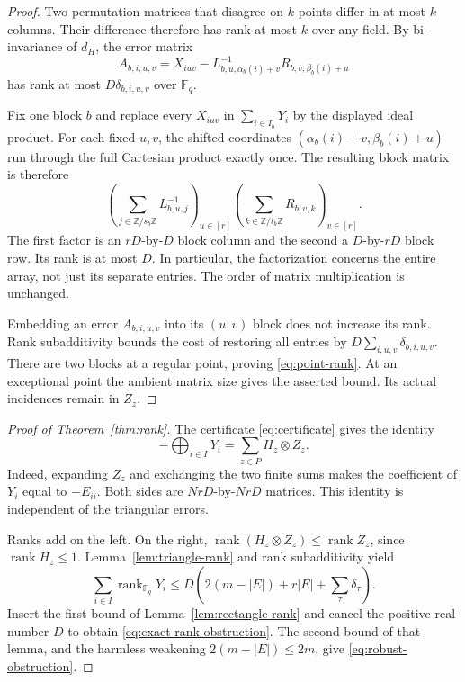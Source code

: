 \documentclass[11pt]{amsart}
\theoremstyle{definition}
\theoremstyle{remark}
\numberwithin{equation}{section}
\newcommand{\F}{\mathbb F}
\newcommand{\Z}{\mathbb Z}
\DeclareMathOperator{\rank}{rank}
\begin{document}
\begin{proof}
Two permutation matrices that disagree on $k$ points differ in at
most $k$ columns. Their difference therefore has rank at most $k$
over any field. By bi-invariance of $d_H$, the error matrix
\[
 A_{b,i,u,v}=
 X_{iuv}-L_{b,u,\alpha_b(i)+v}^{-1}R_{b,v,\beta_b(i)+u}
\]
has rank at most $D\delta_{b,i,u,v}$ over $\F_q$.

Fix one block $b$ and replace every $X_{iuv}$ in
$\sum_{i\in I_b}Y_i$ by the displayed ideal product. For each fixed
$u,v$, the shifted coordinates
$(\alpha_b(i)+v,\beta_b(i)+u)$ run through the full Cartesian product exactly
once. The resulting block matrix is therefore
\begin{equation}\label{eq:local-factorization}
 \left(\sum_{j\in\Z/s_b\Z}L_{b,u,j}^{-1}\right)_{u\in[r]}
 \left(\sum_{k\in\Z/t_b\Z}R_{b,v,k}\right)_{v\in[r]}.
\end{equation}
The first factor is an $rD$-by-$D$ block column and the second a
$D$-by-$rD$ block row. Its rank is at most $D$. In particular, the
factorization concerns the entire array, not just its separate
entries. The order of matrix multiplication is unchanged.

Embedding an error $A_{b,i,u,v}$ into its $(u,v)$ block does not
increase its rank. Rank subadditivity bounds the cost of restoring
all entries by $D\sum_{i,u,v}\delta_{b,i,u,v}$. There are two blocks
at a regular point, proving \eqref{eq:point-rank}. At an exceptional
point the ambient matrix size gives the asserted bound. Its actual
incidences remain in $Z_z$.
\end{proof}

\begin{proof}[Proof of Theorem~\ref{thm:rank}]
The certificate \eqref{eq:certificate} gives the identity
\begin{equation}\label{eq:tensor-identity}
 -\bigoplus_{i\in I}Y_i
 =\sum_{z\in P}H_z\otimes Z_z.
\end{equation}
Indeed, expanding $Z_z$ and exchanging the two finite sums makes
the coefficient of $Y_i$ equal to $-E_{ii}$. Both sides are
$NrD$-by-$NrD$ matrices. This identity is independent of the
triangular errors.

Ranks add on the left. On the right,
$\rank(H_z\otimes Z_z)\le\rank Z_z$, since $\rank H_z\le1$.
Lemma~\ref{lem:triangle-rank} and rank subadditivity yield
\[
 \sum_{i\in I}\rank_{\F_q}Y_i
 \le D\left(2(m-|E|)+r|E|+\sum_\tau\delta_\tau\right).
\]
Insert the first bound of Lemma~\ref{lem:rectangle-rank} and cancel
the positive real number $D$ to obtain
\eqref{eq:exact-rank-obstruction}. The second bound of that lemma,
and the harmless weakening $2(m-|E|)\le2m$, give
\eqref{eq:robust-obstruction}.
\end{proof}
\end{document}
